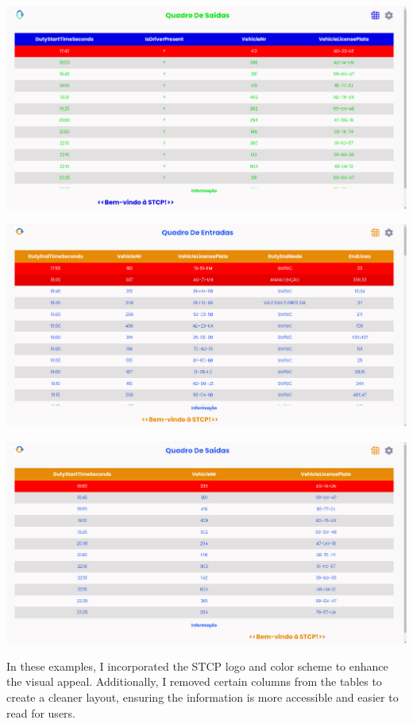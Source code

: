 \documentclass[10pt]{article}
\begin{document}
            \vfill
        \includegraphics[width=1\textwidth]{table_of_exits_stcp1}
            \vfill

            \vfill
        \includegraphics[width=1\textwidth]{table_of_entries_stcp2}
            \vfill

            \vfill
        \includegraphics[width=1\textwidth]{table_of_exits_stcp2}
            \vfill

        In these examples, I incorporated the STCP logo and color scheme to enhance the visual appeal. 
        Additionally, I removed certain columns from the tables to create a cleaner layout, ensuring the information is more accessible and easier to read for users.
\end{document}
